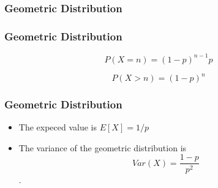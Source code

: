 \documentclass{beamer}
\begin{document}
\begin{frame}
\frametitle{Geometric Distribution}

\end{frame}
\begin{frame}
\frametitle{Geometric Distribution}
\Large
\[ P(X = n) = (1-p)^{n-1}p \]

\[ P(X > n) = (1-p)^n \]


\end{frame}
\begin{frame}
\frametitle{Geometric Distribution}
\Large
\begin{itemize}
\item The expeced value is $ E[X] = 1/p $

\item The variance of the geometric distribution is 
\[Var(X) = \frac{1-p}{p^2}\].

\end{itemize}

\end{frame}
\end{document}
